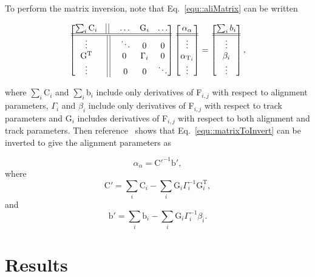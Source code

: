 To perform the matrix inversion, note that Eq.~\ref{equ::aliMatrix} can be
written

\begin{equation}
  \label{equ::matrixToInvert}
  \begin{bmatrix}
    \sum_{i} \mathrm{C}_i & \vline \; \vline \; & \dots &
    \mathrm{G}_i & \dots \\
    \hline \hline
    \vdots & \vline \; \vline & \ddots & 0 & 0 \\
    \mathrm{G}^{\mathrm{T}} & \vline \; \vline & 0 \; & \Gamma_i & 0 \\
    \vdots & \vline \; \vline & 0 & 0 & \ddots
  \end{bmatrix}
  \begin{bmatrix}
    \alpha_{\alpha} \\ \hline \hline \vdots \\ \alpha_{\mathrm{T}_i}
    \\ \vdots
  \end{bmatrix}
  =
  \begin{bmatrix}
    \sum_i b_i \\ \hline \hline \vdots \\ \beta_i \\ \vdots
  \end{bmatrix},
\end{equation}

\noindent
where $\sum_i$C$_i$ and $\sum_i$b$_i$ include only derivatives of F$_{i,j}$ with
respect to alignment parameters, $\Gamma_i$ and $\beta_i$ include only
derivatives of F$_{i,j}$ with respect to track parameters and G$_i$ includes
derivatives of F$_{i,j}$ with respect to both alignment and track parameters.
Then reference~\cite{matrix_inv} shows that Eq.~\ref{equ::matrixToInvert} can be
inverted to give the alignment parameters as

\begin{equation}
\alpha_{\alpha} = \mathrm{C'}^{-1}\mathrm{b}',
\end{equation}
\noindent
where
\begin{equation}
\mathrm{C}' = \sum_i \mathrm{C}_i - \sum_i \mathrm{G}_i \Gamma_i^{-1}
\mathrm{G}_i^{\mathrm{T}},
\end{equation}
\noindent
and
\begin{equation}
\mathrm{b}' = \sum_i \mathrm{b}_i - \sum_i \mathrm{G}_i \Gamma_i^{-1}\beta_i.
\end{equation}


\section{Results}

